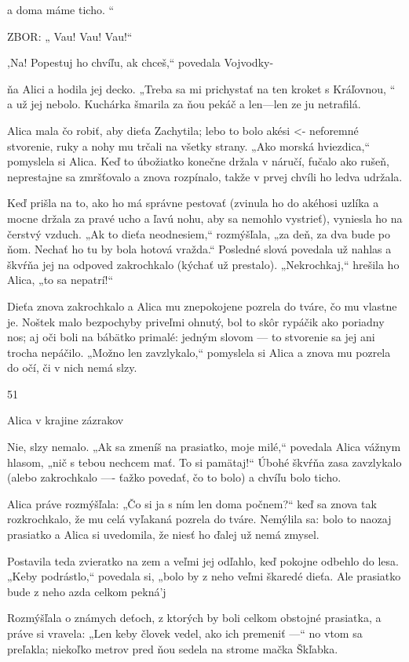 \documentclass[12pt]{article}
\begin{document}
\begin{Parallel}[p]{}{}
{{a doma máme ticho. “

ZBOR:
„ Vau! Vau! Vau!“

\;,Na! Popestuj ho chvíľu, ak chceš,“ povedala Vojvodky-

ňa Alici a hodila jej decko. „Treba sa mi prichystať na ten
kroket s Kráľovnou, “ a už jej nebolo. Kuchárka šmarila za
ňou pekáč a len—len ze ju netrafilá.

Alica mala čo robiť, aby dieťa Zachytila; lebo to bolo akési <-
neforemné stvorenie, ruky a nohy mu trčali na všetky strany.
„Ako morská hviezdica,“ pomyslela si Alica. Keď to
úbožiatko konečne držala v náručí, fučalo ako rušeň,
neprestajne sa zmršťovalo a znova rozpínalo, takže v prvej
chvíli ho ledva udržala.

Keď prišla na to, ako ho má správne pestovať (zvinula ho
do akéhosi uzlíka a mocne držala za pravé ucho a ľavú nohu,
aby sa nemohlo vystrieť), vyniesla ho na čerstvý vzduch. „Ak
to dieťa neodnesiem,“ rozmýšľala, „za deň, za dva bude po
ňom. Nechať ho tu by bola hotová vražda.“ Posledné slová
povedala už nahlas a škvŕňa jej na odpoved zakrochkalo
(kýchať už prestalo). „Nekrochkaj,“ hrešila ho Alica, „to sa
nepatrí!“

Dieťa znova zakrochkalo a Alica mu znepokojene pozrela
do tváre, čo mu vlastne je. Noštek malo bezpochyby
priveľmi ohnutý, bol to skôr rypáčik ako poriadny nos; aj oči
boli na bábätko primalé: jedným slovom — to stvorenie sa
jej ani trocha nepáčilo. „Možno len zavzlykalo,“ pomyslela
si Alica a znova mu pozrela do očí, či v nich nemá slzy.

51

Alica v krajine zázrakov

Nie, slzy nemalo. „Ak sa zmeníš na prasiatko, moje milé,“
povedala Alica vážnym hlasom, „nič s tebou nechcem mať.
To si pamätaj!“ Úbohé škvŕňa zasa zavzlykalo (alebo
zakrochkalo —- ťažko povedať, čo to bolo) a chvíľu bolo
ticho.

Alica práve rozmýšľala: „Čo si ja s ním len doma
počnem?“ keď sa znova tak rozkrochkalo, že mu celá
vyľakaná pozrela do tváre. Nemýlila sa: bolo to naozaj
prasiatko a Alica si uvedomila, že niesť ho ďalej už nemá
zmysel.

Postavila teda zvieratko na zem a veľmi jej odľahlo, keď
pokojne odbehlo do lesa. „Keby podrástlo,“ povedala si,
„bolo by z neho veľmi škaredé dieťa. Ale prasiatko bude
z neho azda celkom pekná'j

Rozmýšľala o známych deťoch, z ktorých by boli celkom
obstojné prasiatka, a práve si vravela: „Len keby človek
vedel, ako ich premeniť —“ no vtom sa preľakla; niekoľko
metrov pred ňou sedela na strome mačka Škľabka.

}}
\end{Parallel}
\end{document}
